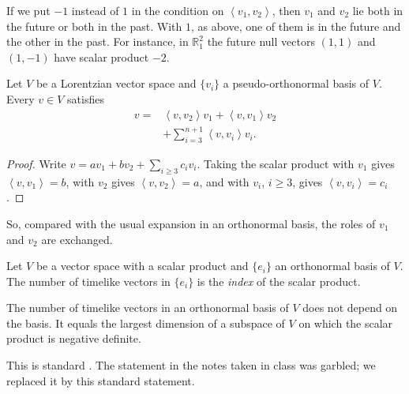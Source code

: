\begin{remark}
\label{remark-palmas-null-pair-sign}
If we put $-1$ instead of $1$ in the
condition on
$\left\langle{} v_1,v_2 \right\rangle{}$,
then $v_1$ and $v_2$ lie both in the future
or both in the past. With $1$, as above,
one of them is in the future and the other
in the past. For instance, in
$\mathbb{R}^2_1$ the future null vectors
$(1,1)$ and $(1,-1)$ have scalar product
$-2$.
\end{remark}

\begin{proposition}
\label{proposition-palmas-null-expansion}
Let $V$ be a Lorentzian vector space and
$\{v_i\}$ a pseudo-orthonormal basis of
$V$. Every $v\in V$ satisfies
$$
\begin{aligned}
v={}&\left\langle{} v,v_2 \right\rangle{}v_1
+\left\langle{} v,v_1 \right\rangle{}v_2\\
&+\sum_{i=3}^{n+1}
\left\langle{} v,v_i \right\rangle{}v_i.
\end{aligned}
$$
\end{proposition}

\begin{proof}
Write
$v=a v_1+bv_2+\sum_{i\geq 3}c_iv_i$.
Taking the scalar product with $v_1$
gives
$\left\langle{} v,v_1 \right\rangle{}=b$,
with $v_2$ gives
$\left\langle{} v,v_2 \right\rangle{}=a$,
and with $v_i$, $i\geq 3$, gives
$\left\langle{} v,v_i \right\rangle{}=c_i$.
\end{proof}

So, compared with the usual expansion in an
orthonormal basis, the roles of $v_1$ and
$v_2$ are exchanged.

\begin{definition}[Index]
\label{definition-palmas-index}
Let $V$ be a vector space with a scalar
product and $\{e_i\}$ an orthonormal basis
of $V$. The number of timelike vectors in
$\{e_i\}$ is the \emph{index} of the scalar
product.
\end{definition}

\begin{proposition}
\label{proposition-palmas-sylvester}
The number of timelike vectors in an
orthonormal basis of $V$ does not depend on
the basis. It equals the largest dimension
of a subspace of $V$ on which the scalar
product is negative definite.
\end{proposition}

This is standard \cite{oneill}. The
statement in the notes taken in class was
garbled; we replaced it by this standard
statement.

